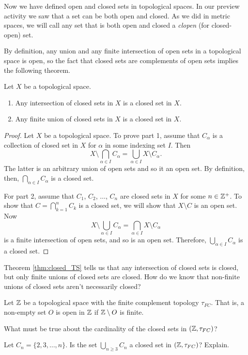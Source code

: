 \label{sec_union_inter_closed}

Now we have defined open and closed sets in topological spaces. In our preview activity we saw that a set can be both open and closed. As we did in metric spaces, we will call any set that is both open and closed a \emph{clopen} (for closed-open) set.

By definition, any union and any finite intersection of open sets in a topological space is open, so the fact that closed sets are complements of open sets implies the following theorem. 

\begin{theorem} \label{thm:closed_TS} Let $X$ be a topological space.
\begin{enumerate}
\item Any intersection of closed sets in $X$ is a closed set in $X$.
\item Any finite union of closed sets in $X$ is a closed set in $X$. 
\end{enumerate}
\end{theorem}

\begin{proof} Let $X$ be a topological space. To prove part 1, assume that $C_{\alpha}$ is a collection of closed set in $X$ for $\alpha$ in some indexing set $I$. Then 
\[X \setminus \bigcap_{\alpha \in I} C_{\alpha} = \bigcup_{\alpha \in I} X \setminus C_{\alpha}.\]
The latter is an arbitrary union of open sets and so it an open set. By definition, then, $\bigcap_{\alpha \in I} C_{\alpha}$ is a closed set. 

For part 2, assume that $C_1$, $C_2$, $\ldots$, $C_n$ are closed sets in $X$ for some $n \in \mathbb{Z}^+$. To show that $C = \bigcap_{k=1}^n C_k$ is a closed set, we will show that $X \setminus C$ is an open set. Now 
\[X \setminus \bigcup_{\alpha \in I} C_{\alpha} = \bigcap_{\alpha \in I} X \setminus C_{\alpha}\]
is a finite intersection of open sets, and so is an open set. Therefore, $\bigcup_{\alpha \in I} C_{\alpha} $ is a closed set. 
\end{proof}

Theorem \ref{thm:closed_TS} tells us that any intersection of closed sets is closed, but only finite unions of closed sets are closed. How do we know that non-finite unions of closed sets aren't necessarily closed?

\begin{activity} Let $\mathbb{Z}$ be a topological space with the finite complement topology $\tau_{FC}$. That is, a non-empty set $O$ is open in $\mathbb{Z}$ if $\mathbb{Z} \setminus O$ is finite. 
	\ba
	\item What must be true about the cardinality of the closed sets in $(\mathbb{Z}, \tau_{FC})$? 
	
	\item Let $C_n = \{2, 3, \ldots, n\}$. Is the set $\bigcup_{n \geq 3} C_n$ a closed set in $(\mathbb{Z}, \tau_{FC})$? Explain. 

	\ea
	
\end{activity}
	
